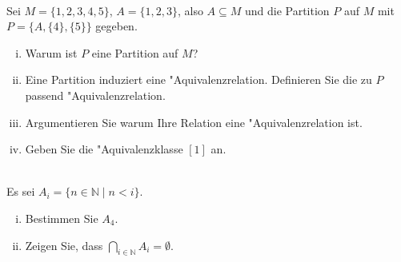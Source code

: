 \\
Sei $M=\{1,2,3,4,5\}$, $A=\{1,2,3\}$, also $A\subseteq M$ und die Partition $P$ auf $M$ mit $P=\{A, \{4\}, \{5\}\}$ gegeben.
\begin{enumerate}[(i)]
    \item Warum ist $P$ eine Partition auf $M$? 
    \item Eine Partition induziert eine "Aquivalenzrelation. Definieren Sie die zu $P$ passend "Aquivalenzrelation.
    \item Argumentieren Sie warum Ihre Relation eine "Aquivalenzrelation ist.
    \item Geben Sie die "Aquivalenzklasse $[1]$ an.
\end{enumerate}



\\
Es sei $A_i=\{n\in\mathbb{N}\mid n<i\}$.
\begin{enumerate}[(i)]
    \item Bestimmen Sie $A_4$.
    \item Zeigen Sie, dass $\bigcap_{i\in\mathbb{N}}A_i=\emptyset$.
\end{enumerate}

